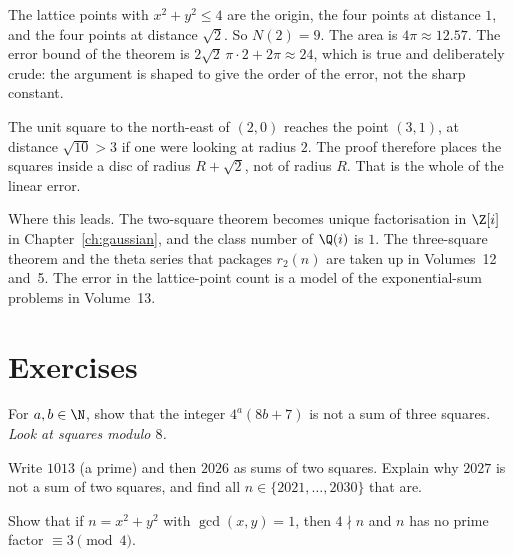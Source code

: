 \begin{examplex}
The lattice points with $x^2+y^2\le 4$ are the origin, the four points at distance $1$, and the four points at distance $\sqrt 2$. So $N(2)=9$. The area is $4\pi\approx 12.57$. The error bound of the theorem is $2\sqrt 2\,\pi\cdot 2+2\pi\approx 24$, which is true and deliberately crude: the argument is shaped to give the order of the error, not the sharp constant.
\end{examplex}

\begin{examplex}
The unit square to the north-east of $(2,0)$ reaches the point $(3,1)$, at distance $\sqrt{10}>3$ if one were looking at radius $2$. The proof therefore places the squares inside a disc of radius $R+\sqrt 2$, not of radius $R$. That is the whole of the linear error.
\end{examplex}

\begin{beauty}
Where this leads. The two-square theorem becomes unique factorisation in $\Z[i]$ in Chapter~\ref{ch:gaussian}, and the class number of $\Q(i)$ is $1$. The three-square theorem and the theta series that packages $r_2(n)$ are taken up in Volumes~12 and~5. The error in the lattice-point count is a model of the exponential-sum problems in Volume~13.
\end{beauty}

\section{Exercises}

\begin{exercise}[$\star$]\label{ex:three}
For $a,b\in\N$, show that the integer $4^a(8b+7)$ is not a sum of three squares. \emph{Look at squares modulo $8$.}
\end{exercise}

\begin{exercise}[$\star$]\label{ex:2026}
Write $1013$ (a prime) and then $2026$ as sums of two squares. Explain why $2027$ is not a sum of two squares, and find all $n\in\{2021,\dots,2030\}$ that are.
\end{exercise}

\begin{exercise}[$\star\star$]\label{ex:primitive2}
Show that if $n=x^2+y^2$ with $\gcd(x,y)=1$, then $4\nmid n$ and $n$ has no prime factor $\equiv3\pmod4$.
\end{exercise}


